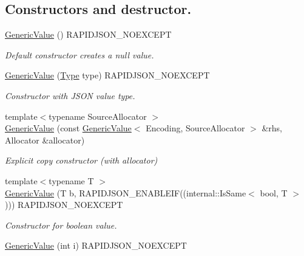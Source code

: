 \subsection*{Constructors and destructor.}
\begin{DoxyCompactItemize}
\item 
\hyperlink{a00130_ab0205d57176d83814ea4e4598c596fe8}{Generic\+Value} () R\+A\+P\+I\+D\+J\+S\+O\+N\+\_\+\+N\+O\+E\+X\+C\+E\+PT\hypertarget{a00130_ab0205d57176d83814ea4e4598c596fe8}{}\label{a00130_ab0205d57176d83814ea4e4598c596fe8}

\begin{DoxyCompactList}\small\item\em Default constructor creates a null value. \end{DoxyCompactList}\item 
\hyperlink{a00130_a83c8f84b8e61f2f40414b703b75aea61}{Generic\+Value} (\hyperlink{a00677_a1d1cfd8ffb84e947f82999c682b666a7}{Type} type) R\+A\+P\+I\+D\+J\+S\+O\+N\+\_\+\+N\+O\+E\+X\+C\+E\+PT
\begin{DoxyCompactList}\small\item\em Constructor with J\+S\+ON value type. \end{DoxyCompactList}\item 
{\footnotesize template$<$typename Source\+Allocator $>$ }\\\hyperlink{a00130_a5161c0c98ba9144c50a38acde28a5ede}{Generic\+Value} (const \hyperlink{a00130}{Generic\+Value}$<$ Encoding, Source\+Allocator $>$ \&rhs, Allocator \&allocator)
\begin{DoxyCompactList}\small\item\em Explicit copy constructor (with allocator) \end{DoxyCompactList}\item 
{\footnotesize template$<$typename T $>$ }\\\hyperlink{a00130_a0f6a0394bfffaedde88e433b2265194c}{Generic\+Value} (T b, R\+A\+P\+I\+D\+J\+S\+O\+N\+\_\+\+E\+N\+A\+B\+L\+E\+IF((internal\+::\+Is\+Same$<$ bool, T $>$))) R\+A\+P\+I\+D\+J\+S\+O\+N\+\_\+\+N\+O\+E\+X\+C\+E\+PT
\begin{DoxyCompactList}\small\item\em Constructor for boolean value. \end{DoxyCompactList}\item 
\hyperlink{a00130_aafc754ade38421c179f5c8933ecbaf45}{Generic\+Value} (int i) R\+A\+P\+I\+D\+J\+S\+O\+N\+\_\+\+N\+O\+E\+X\+C\+E\+PT\hypertarget{a00130_aafc754ade38421c179f5c8933ecbaf45}{}\label{a00130_aafc754ade38421c179f5c8933ecbaf45}


\end{DoxyCompactItemize}
